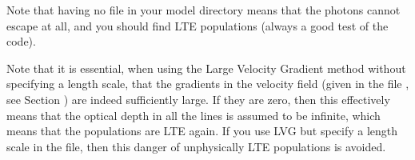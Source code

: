 \documentclass[letterpaper,10pt,english]{sphinxmanual}
\begin{document}
Note that having no    file
in your model directory means that the photons cannot escape at all, and you
should find LTE populations (always a good test of the code).

Note that it is essential, when using the Large Velocity Gradient method without
specifying a length scale, that the gradients in the velocity field (given in
the file , see Section {\hyperref[\detokenize{lineradtrans:sec-velo-field}]{}}) are indeed
sufficiently large. If they are zero, then this effectively means that the
optical depth in all the lines is assumed to be infinite, which means that the
populations are LTE again. If you use LVG but  specify a length scale in
the  file, then this danger of unphysically LTE
populations is avoided.


\end{document}
